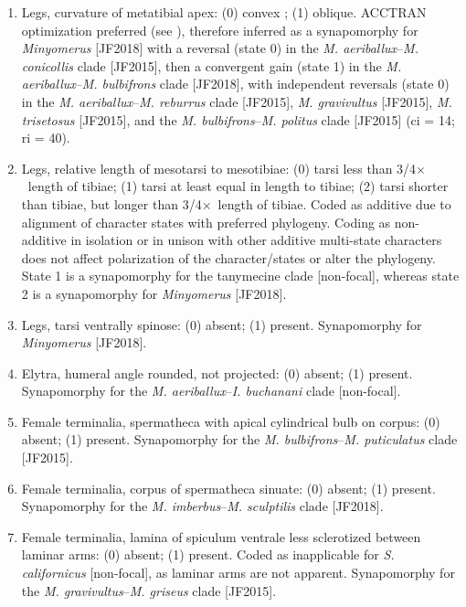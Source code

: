 \documentclass[fleqn,10pt,lineno]{wlpeerj} %
\newcommand{\x}{$\times$~}
\begin{document}
\begin{enumerate}
	 	\item Legs, curvature of metatibial apex: (0) convex ; (1) oblique. ACCTRAN optimization preferred (see \citealt{agnarsson2008}), therefore inferred as a synapomorphy for \textit{Minyomerus} [JF2018] with a reversal (state 0) in the \textit{M. aeriballux}--\textit{M. conicollis} clade [JF2015], then a convergent gain (state 1) in the \textit{M. aeriballux}--\textit{M. bulbifrons} clade [JF2018], with independent reversals (state 0) in the \textit{M. aeriballux}--\textit{M. reburrus} clade [JF2015], \textit{M. gravivultus} [JF2015], \textit{M. trisetosus} [JF2015], and the \textit{M. bulbifrons}--\textit{M. politus} clade [JF2015] (ci = 14; ri = 40).
	 	
		\item Legs, relative length of mesotarsi to mesotibiae: (0) tarsi less than 3/4\x length of tibiae; (1) tarsi at least equal in length to tibiae; (2) tarsi shorter than tibiae, but longer than 3/4\x length of tibiae. Coded as additive due to alignment of character states with preferred phylogeny. Coding as non-additive in isolation or in unison with other additive multi-state characters does not affect polarization of the character/states or alter the phylogeny. State 1 is a synapomorphy for the tanymecine clade [non-focal], whereas state 2 is a synapomorphy for \textit{Minyomerus} [JF2018].
		
		\item Legs, tarsi ventrally spinose: (0) absent; (1) present. Synapomorphy for \textit{Minyomerus} [JF2018].
		
		\item Elytra, humeral angle rounded, not projected: (0) absent; (1) present. Synapomorphy for the \textit{M. aeriballux}--\textit{I. buchanani} clade [non-focal].
		
		\item Female terminalia, spermatheca with apical cylindrical bulb on corpus: (0) absent; (1) present. Synapomorphy for the \textit{M. bulbifrons}--\textit{M. puticulatus} clade [JF2015].
		
		\item Female terminalia, corpus of spermatheca sinuate: (0) absent; (1) present. Synapomorphy for the \textit{M. imberbus}--\textit{M. sculptilis} clade [JF2018].
		
		\item Female terminalia, lamina of spiculum ventrale less sclerotized between laminar arms: (0) absent; (1) present. Coded as inapplicable for \textit{S. californicus} [non-focal], as laminar arms are not apparent. Synapomorphy for the \textit{M. gravivultus}--\textit{M. griseus} clade [JF2015].
		

\end{enumerate}
\end{document}
